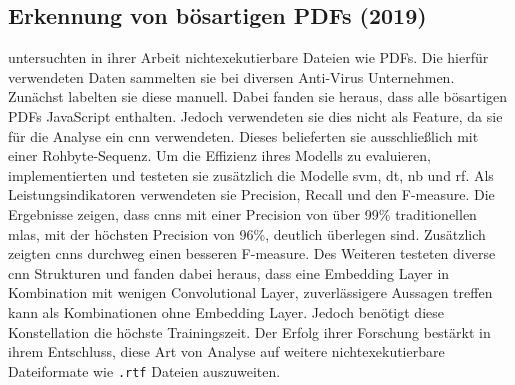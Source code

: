 \documentclass[
    12pt, %
    DIV10,
    ngerman, %
    a4paper, %
    oneside, %
    titlepage, %
    parskip=half, %
    headings=normal, %
    listof=totoc, %
    bibliography=totoc, %
    index=totoc, %
    captions=tableheading, %
    final %
]{scrreprt}
\begin{document}
\subsection{Erkennung von bösartigen PDFs (2019)}
\textcite{Jeong2019} untersuchten in ihrer Arbeit nichtexekutierbare Dateien wie PDFs. Die hierfür verwendeten Daten sammelten sie bei diversen Anti-Virus Unternehmen. Zunächst labelten sie diese manuell. Dabei fanden sie heraus, dass alle bösartigen PDFs JavaScript enthalten. Jedoch verwendeten sie dies nicht als Feature, da sie für die Analyse ein \ac{cnn} verwendeten. Dieses belieferten sie ausschlie{\ss}lich mit einer Rohbyte-Sequenz. Um die Effizienz ihres Modells zu evaluieren, implementierten und testeten sie zusätzlich die Modelle \ac{svm}, \ac{dt}, \acl{nb} und \ac{rf}. Als Leistungsindikatoren verwendeten sie Precision, Recall und den F-measure. Die Ergebnisse zeigen, dass \ac{cnns} mit einer Precision von über 99\% traditionellen \ac{mlas}, mit der höchsten Precision von 96\%, deutlich überlegen sind. Zusätzlich zeigten \ac{cnns} durchweg einen besseren F-measure. Des Weiteren testeten \textcite{Jeong2019} diverse \ac{cnn} Strukturen und fanden dabei heraus, dass eine Embedding Layer in Kombination mit wenigen Convolutional Layer, zuverlässigere Aussagen treffen kann als Kombinationen ohne Embedding Layer. Jedoch benötigt diese Konstellation die höchste Trainingszeit. Der Erfolg ihrer Forschung bestärkt \textcite{Jeong2019} in ihrem Entschluss, diese Art von Analyse auf weitere nichtexekutierbare Dateiformate wie \texttt{.rtf} Dateien auszuweiten.
\newpage
\end{document}
